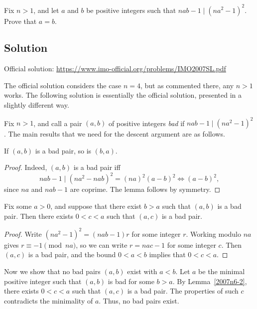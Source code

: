 Fix $n > 1$, and let $a$ and $b$ be positive integers such that $nab - 1 \mid (na^2 - 1)^2$.
Prove that $a = b$.



\subsection*{Solution}

Official solution: \url{https://www.imo-official.org/problems/IMO2007SL.pdf}

The official solution considers the case $n = 4$, but as commented there, any $n > 1$ works.
The following solution is essentially the official solution, presented in a slightly different way.

Fix $n > 1$, and call a pair $(a, b)$ of positive integers \emph{bad} if $nab - 1 \mid (na^2 - 1)^2$.
The main results that we need for the descent argument are as follows.

\begin{lemma}\label{2007n6-1}
If $(a, b)$ is a bad pair, so is $(b, a)$.
\end{lemma}
\begin{proof}
Indeed, $(a, b)$ is a bad pair iff
\[ nab - 1 \mid (na^2 - nab)^2 = (na)^2 (a - b)^2 \iff (a - b)^2, \]
    since $na$ and $nab - 1$ are coprime.
The lemma follows by symmetry.
\end{proof}

\begin{lemma}\label{2007n6-2}
Fix some $a > 0$, and suppose that there exist $b > a$ such that $(a, b)$ is a bad pair.
Then there exists $0 < c < a$ such that $(a, c)$ is a bad pair.
\end{lemma}
\begin{proof}
Write $(na^2 - 1)^2 = (nab - 1) r$ for some integer $r$.
Working modulo $na$ gives $r \equiv -1 \pmod{na}$, so we can write $r = nac - 1$ for some integer $c$.
Then $(a, c)$ is a bad pair, and the bound $0 < a < b$ implies that $0 < c < a$.
\end{proof}

Now we show that no bad pairs $(a, b)$ exist with $a < b$.
Let $a$ be the minimal positive integer such that $(a, b)$ is bad for some $b > a$.
By Lemma~\ref{2007n6-2}, there exists $0 < c < a$ such that $(a, c)$ is a bad pair.
The properties of such $c$ contradicts the minimality of $a$.
Thus, no bad pairs exist.
